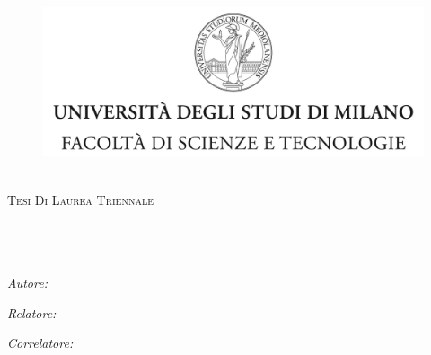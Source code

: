 \documentclass[11pt, oneside]{Thesis} %
\begin{document}
\begin{titlepage}
\begin{center}

\begin{figure}
	\begin{center}
		\includegraphics[scale=0.25]{Figures/tesiSCIENZE_TECNOLOGIE.jpg}
	\end{center}
\end{figure}

\smallskip
\large\textsc{\deptname}\\[1.0cm]

\textsc{\Large Tesi Di Laurea Triennale}\\[0.5cm] %

\HRule \\[0.4cm] %
{\huge \bfseries \ttitle}\\[0.4cm] %
\HRule \\[1.5cm] %
 
\begin{minipage}{0.4\textwidth}

\begin{flushleft} \large
\emph{Autore:}\\
\authornames             %
\end{flushleft}
\end{minipage}
\begin{minipage}{0.4\textwidth}
\begin{flushright} \large
\emph{Relatore:} \\
\supname		 %

\emph{Correlatore:} \\
\cosupname		 %
\end{flushright}
\end{minipage}\\[3cm]
 

\end{center}
\end{titlepage}
\end{document}
